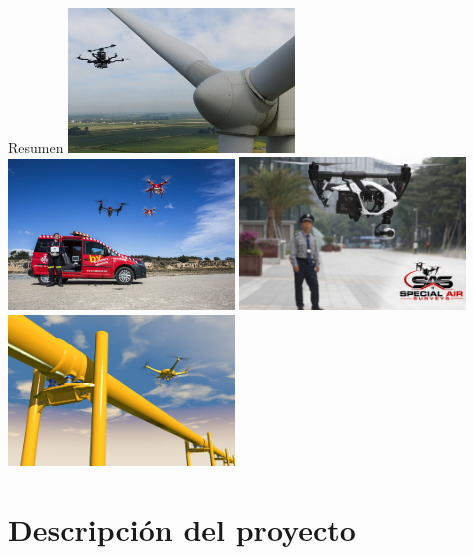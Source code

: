 \documentclass[
	12pt, %
	aspectratio=169, %
]{beamer}
\begin{document}
\begin{frame}{Resumen}
  \centering
  \includegraphics[width=0.45\textwidth,height=0.35\textheight]{inspection_drone}
  \includegraphics[width=0.45\textwidth,height=0.35\textheight]{drone_rescue}
  \includegraphics[width=0.45\textwidth,height=0.35\textheight]{security_drone}
  \includegraphics[width=0.45\textwidth,height=0.35\textheight]{pipe_drone}
\end{frame}

\section{Descripción del proyecto}
\end{document}
